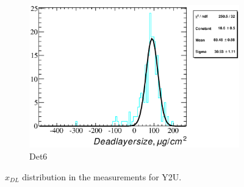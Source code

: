 \documentclass[a4paper,12pt]{article}
\begin{document}
\begin{figure}
\begin{subfigure}[b]{0.325\textwidth}
\includegraphics[width=\textwidth]{gfx/run13_alpha_study_novoltagevariation/Y2U/c_hDeadLayerSize_by_run_distribution6_Y2U.eps}
\caption{Det6}
\end{subfigure}
\caption{$x_{DL}$ distribution in the measurements for Y2U.}
\end{figure}
\end{document}
